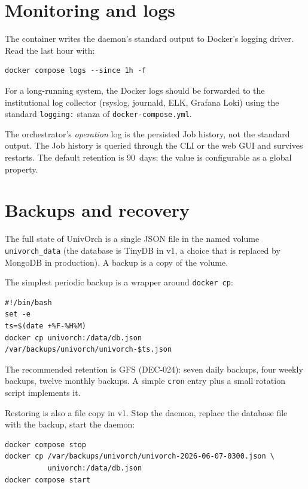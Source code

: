\section{Monitoring and logs}

The container writes the daemon's standard output to Docker's
logging driver. Read the last hour with:

\begin{verbatim}
docker compose logs --since 1h -f
\end{verbatim}

For a long-running system, the Docker logs should be forwarded to
the institutional log collector (rsyslog, journald, ELK, Grafana
Loki) using the standard \texttt{logging:} stanza of
\texttt{docker-compose.yml}.

The orchestrator's \emph{operation} log is the persisted Job
history, not the standard output. The Job history is queried
through the CLI or the web GUI and survives restarts. The default
retention is 90~days; the value is configurable as a global
property.

\section{Backups and recovery}

The full state of UnivOrch is a single JSON file in the named
volume \texttt{univorch\_data} (the database is TinyDB in v1, a
choice that is replaced by MongoDB in production). A backup is a
copy of the volume.

The simplest periodic backup is a wrapper around \texttt{docker
cp}:

\begin{verbatim}
#!/bin/bash
set -e
ts=$(date +%F-%H%M)
docker cp univorch:/data/db.json /var/backups/univorch/univorch-$ts.json
\end{verbatim}

The recommended retention is GFS (DEC-024): seven daily backups,
four weekly backups, twelve monthly backups. A simple
\texttt{cron} entry plus a small rotation script implements it.

Restoring is also a file copy in v1. Stop the daemon, replace the
database file with the backup, start the daemon:

\begin{verbatim}
docker compose stop
docker cp /var/backups/univorch/univorch-2026-06-07-0300.json \
          univorch:/data/db.json
docker compose start
\end{verbatim}

